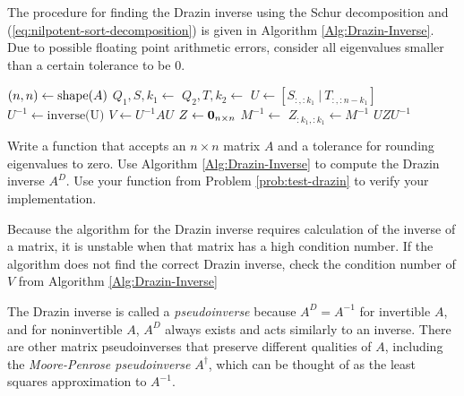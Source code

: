 The procedure for finding the Drazin inverse using the Schur decomposition and (\ref{eq:nilpotent-sort-decomposition}) is given in Algorithm \ref{Alg:Drazin-Inverse}.
Due to possible floating point arithmetic errors, consider all eigenvalues smaller than a certain tolerance to be $0$.

\begin{algorithm}[H]
\begin{algorithmic}[1]
    \State $(n,n) \gets \mathrm{shape}(A)$
    \State $Q_1,S,k_1 \gets $ 
    \State $Q_2,T,k_2 \gets $ 
    \State $U \gets [S_{:,:k_1}\ |\ T_{:,:n - k_1}]$
    \State $U^{-1} \gets \text{inverse(U)}$
    \State $V \gets U^{-1}AU$
    \State $Z \gets \mathbf{0}_{n\times n}$
        \State $M^{-1} \gets $ 
        \State $Z_{:k_1,:k_1} \gets M^{-1}$
    \EndIf
    \State {} $UZU^{-1}$
\EndProcedure
\end{algorithmic}
\caption{}
\label{Alg:Drazin-Inverse}
\end{algorithm}

\begin{problem} %
Write a function that accepts an $n \times n$ matrix $A$ and a tolerance for rounding eigenvalues to zero.
Use Algorithm \ref{Alg:Drazin-Inverse} to compute the Drazin inverse $A^D$.
Use your function from Problem \ref{prob:test-drazin} to verify your implementation.
\end{problem}

\begin{warn} %
Because the algorithm for the Drazin inverse requires calculation of the inverse of a matrix, it is unstable when that matrix has a high condition number.
If the algorithm does not find the correct Drazin inverse, check the condition number of $V$ from Algorithm \ref{Alg:Drazin-Inverse}
\end{warn}

\begin{info}
The Drazin inverse is called a \emph{pseudoinverse} because $A^D = A^{-1}$ for invertible $A$, and for noninvertible $A$, $A^D$ always exists and acts similarly to an inverse.
There are other matrix pseudoinverses that preserve different qualities of $A$, including the \emph{Moore-Penrose pseudoinverse} $A^\dagger$, which can be thought of as the least squares approximation to $A^{-1}$.
\end{info}

